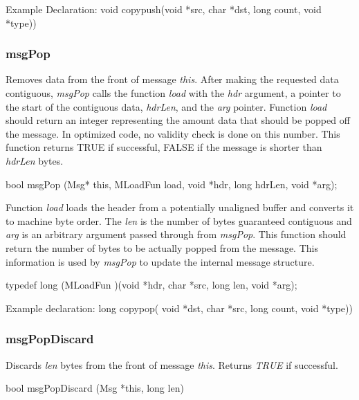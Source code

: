 {\sanss Example Declaration: }{\sem void} {\bold copypush}({\sem void}
*{\caps src}, {\sem char} *{\caps dst}, {\sem long} {\caps  count}, {\sem void} *{\caps type}))

\subsubsection{msgPop}

Removes data from the front of message {\em this}.  After making the
requested data contiguous, {\em msgPop} calls the function {\em load}
with the {\em hdr} argument, a pointer to the start of the contiguous
data, {\em hdrLen}, and the {\em arg} pointer.  Function {\em load}
should return an integer representing the amount data that should be
popped off the message.  In optimized code, no validity check is done
on this number. This function returns TRUE if successful, FALSE if the
message is shorter than {\em hdrLen} bytes.
\medskip

{\sem bool}  {\bold msgPop} ({\sem Msg*} {\caps this}, {\sem MLoadFun} {\caps load}, {\sem void} *{\caps hdr}, {\sem long} {\caps hdrLen}, {\sem void} *{\caps arg});
\medskip

Function {\em load} loads the header from a potentially unaligned
buffer and converts it to machine byte order.  The {\em len} is the
number of bytes guaranteed contiguous and {\em arg} is an arbitrary
argument passed through from {\em msgPop}.  This function should
return the number of bytes to be actually popped from the message.
This information is used by {\em msgPop} to update the internal
message structure.
\medskip

{\sem typedef long} ({\bold *MLoadFun} )({\sem void} *{\caps hdr}, {\sem char} *{\caps src}, {\sem long} {\caps len}, {\sem void} *{\caps arg});
\medskip

{\sanss Example declaration: }{\sem long} {\bold copypop}(
{\sem void} *{\caps dst}, 
{\sem char} *{\caps src}, 
{\sem long} {\caps  count}, 
{\sem void} *{\caps type}))

\subsubsection{msgPopDiscard}

Discards {\em len} bytes from the front of message {\em this}.
Returns {\em TRUE} if successful.
\medskip

{\sem bool}  {\bold msgPopDiscard} ({\sem Msg} *{\caps this}, {\sem
long} {\caps len})
\medskip

